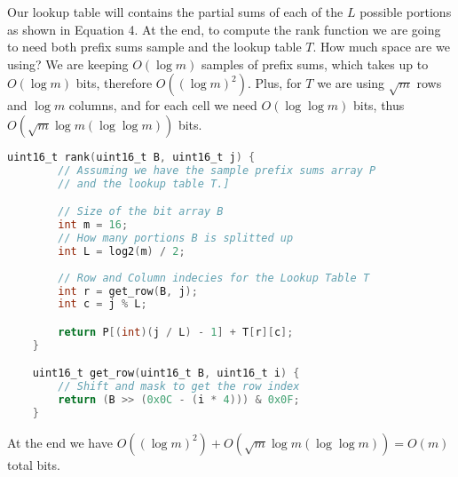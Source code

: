 \documentclass{article}
\begin{document}
\noindent Our lookup table will contains the partial sums of each of the $L$ possible portions as shown in Equation 4. At the end, to compute the rank function we are going to need
both prefix sums sample and the lookup table $T$. How much space are we using? We are keeping $O(\log m)$ samples of prefix sums, which takes up to $O(\log m)$ bits, therefore $O((\log{m})^2)$.
Plus, for $T$ we are using $\sqrt m$ rows and $\log m$ columns, and for each cell we need $O(\log \log m)$ bits, thus $O(\sqrt{m}\log m (\log \log m))$ bits.

\begin{lstlisting}[language=C,caption=`Rank function implemented using a bit array of 16 elements.']
    uint16_t rank(uint16_t B, uint16_t j) {
        // Assuming we have the sample prefix sums array P
        // and the lookup table T.]

        // Size of the bit array B
        int m = 16; 
        // How many portions B is splitted up
        int L = log2(m) / 2;
        
        // Row and Column indecies for the Lookup Table T
        int r = get_row(B, j);
        int c = j % L;

        return P[(int)(j / L) - 1] + T[r][c];
    }

    uint16_t get_row(uint16_t B, uint16_t i) {
        // Shift and mask to get the row index
        return (B >> (0x0C - (i * 4))) & 0x0F;
    }
\end{lstlisting}

\noindent At the end we have $O((\log m)^2) + O(\sqrt{m}\log m (\log \log m)) = O(m)$ total bits.
\end{document}
